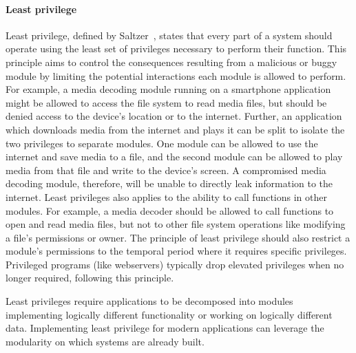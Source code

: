 \paragraph{Least privilege}
Least privilege, defined by Saltzer~\cite{SaltzerS75}, states that every
part of a system should operate using the least set of privileges necessary
to perform their function.
This principle aims to control the consequences resulting from a malicious or
buggy module by limiting the potential interactions each module is allowed
to perform.
For example, a media decoding module running on a smartphone application
might be allowed to access the file system to read media files, but should be
denied access to the device's location or to the internet.
Further, an application which downloads media from the internet and plays
it can be split to isolate the two privileges to separate modules.
One module can be allowed to use the internet and save media to a file, and
the second module can be allowed to play media from that file and write to
the device's screen.
A compromised media decoding module, therefore, will be unable to directly
leak information to the internet.
Least privileges also applies to the ability to call functions in
other modules.
For example, a media decoder should be allowed to call functions to open
and read media files, but not to other file system operations like
modifying a file's permissions or owner.
The principle of least privilege should also restrict a module's permissions
to the temporal period where it requires specific privileges.
Privileged programs (like webservers) typically drop elevated privileges 
when no longer required, following this principle.

Least privileges require applications to be decomposed into modules 
implementing logically different functionality or working on logically
different data.
Implementing least privilege for modern applications can leverage the
modularity on which systems are already built.

